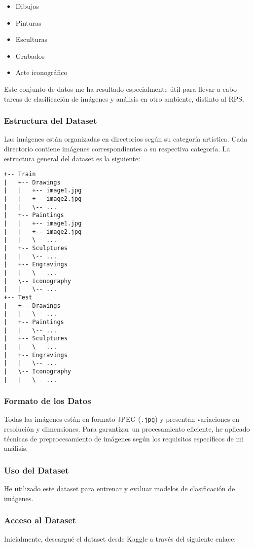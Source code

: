 \begin{itemize}
    \item Dibujos
    \item Pinturas
    \item Esculturas
    \item Grabados
    \item Arte iconográfico
\end{itemize}

Este conjunto de datos me ha resultado especialmente útil para llevar a cabo tareas de clasificación de imágenes y
análisis en otro ambiente, distinto al RPS\@.

\subsubsection{Estructura del Dataset}
Las imágenes están organizadas en directorios según su categoría artística.
Cada directorio contiene imágenes correspondientes a su respectiva categoría.
La estructura general del dataset es la siguiente:

\begin{verbatim}
+-- Train
|   +-- Drawings
|   |   +-- image1.jpg
|   |   +-- image2.jpg
|   |   \-- ...
|   +-- Paintings
|   |   +-- image1.jpg
|   |   +-- image2.jpg
|   |   \-- ...
|   +-- Sculptures
|   |   \-- ...
|   +-- Engravings
|   |   \-- ...
|   \-- Iconography
|   |   \-- ...
+-- Test
|   +-- Drawings
|   |   \-- ...
|   +-- Paintings
|   |   \-- ...
|   +-- Sculptures
|   |   \-- ...
|   +-- Engravings
|   |   \-- ...
|   \-- Iconography
|   |   \-- ...
\end{verbatim}

\subsubsection{Formato de los Datos}
Todas las imágenes están en formato JPEG (\texttt{.jpg}) y presentan variaciones en resolución y dimensiones.
Para garantizar un procesamiento eficiente, he aplicado técnicas de preprocesamiento de imágenes según los requisitos
específicos de mi análisis.

\subsubsection{Uso del Dataset}
He utilizado este dataset para entrenar y evaluar modelos de clasificación de imágenes.

\subsubsection{Acceso al Dataset}
Inicialmente, descargué el dataset desde Kaggle a través del siguiente enlace:

